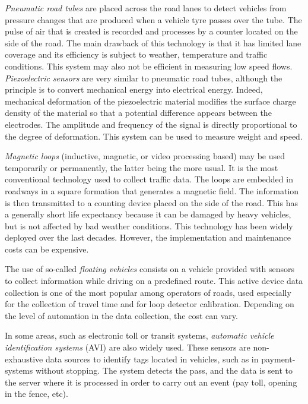 \documentclass[preprint,authoryear,12pt]{elsarticle}
\begin{document}
\emph{Pneumatic road tubes} are placed across the road lanes to detect vehicles from pressure changes that are produced when a vehicle tyre passes over the tube. The pulse of air that is created is recorded and processes by a counter located on the side of the road. The main drawback of this technology is that it has limited lane coverage and its efficiency is subject to weather, temperature and traffic conditions. This system may also not be efficient in measuring low speed flows.
\emph{Piezoelectric sensors} are very similar to pneumatic road tubes, although the principle is to convert mechanical energy into electrical energy. Indeed, mechanical deformation of the piezoelectric material modifies the surface charge density of the material so that a potential difference appears between the electrodes. The amplitude and frequency of the signal is directly proportional to the degree of deformation. This system can be used to measure weight and speed.

\emph{Magnetic loops} (inductive, magnetic, or video processing based) may be used temporarily or permanently, the latter being the more usual. 
It is the most conventional technology used to collect traffic data. The loops are embedded in roadways in a square formation that generates a magnetic field. The information is then transmitted to a counting device placed on the side of the road. This has a generally short life expectancy because it can be damaged by heavy vehicles, but is not affected by bad weather conditions. This technology has been widely deployed over the last decades. However, the implementation and maintenance costs can be expensive.

The use of so-called \emph{floating vehicles} consists on a vehicle provided with sensors to collect information while driving on a predefined route.
This active device data collection is one of the most popular among operators of roads, used especially for the collection of travel time and for loop detector calibration.
Depending on the level of automation in the data collection, the cost can vary.

In some areas, such as electronic toll or transit systems, \emph{automatic vehicle identification systems} (AVI) are also widely used. 
These sensors are non-exhaustive data sources to identify tags located in vehicles, such as in payment-systems without stopping. 
The system detects the pass, and the data is sent to the server where it is processed in order to carry out an event (pay toll, opening in the fence, etc).
\end{document}
